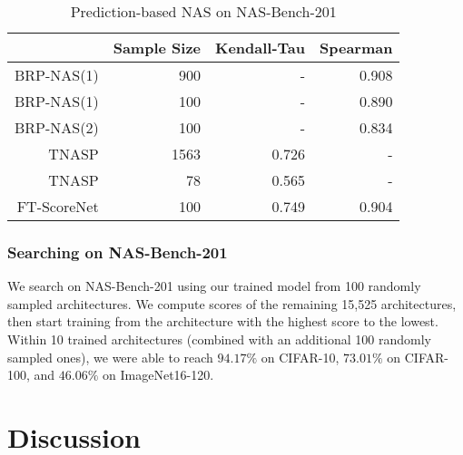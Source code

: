 \documentclass[lettersize,journal]{IEEEtran}
\begin{document}
            \begin{table} 
                \caption{Prediction-based NAS on NAS-Bench-201}
                \label{tab:SAC_Prediction}
                \centering
                \begin{tabular}{r|rrr}
                \toprule
                    & Sample Size & Kendall-Tau & Spearman\\
                    \midrule
                    BRP-NAS(1) \cite{BRP-NAS} & 900 & - & 0.908 \\
                    BRP-NAS(1) \cite{BRP-NAS} & 100 & - & 0.890 \\
                    BRP-NAS(2) \cite{BRP-NAS} & 100 & - & 0.834 \\
                    TNASP \cite{TNASP} & 1563 & 0.726 & - \\
                    TNASP \cite{TNASP} & 78 & 0.565 & - \\
                    FT-ScoreNet & 100 & 0.749 & 0.904 \\
                \bottomrule
            \end{tabular}
            \end{table}
            
        \subsubsection{Searching on NAS-Bench-201}
            We search on NAS-Bench-201 using our trained model from 100 randomly sampled architectures. We compute scores of the remaining 15,525 architectures, then start training from the architecture with the highest score to the lowest. Within 10 trained architectures (combined with an additional 100 randomly sampled ones), we were able to reach $94.17\%$ on CIFAR-10, $73.01\%$ on CIFAR-100, and $46.06\%$ on ImageNet16-120.

\section{Discussion} \label{sec:discussion}
\end{document}
